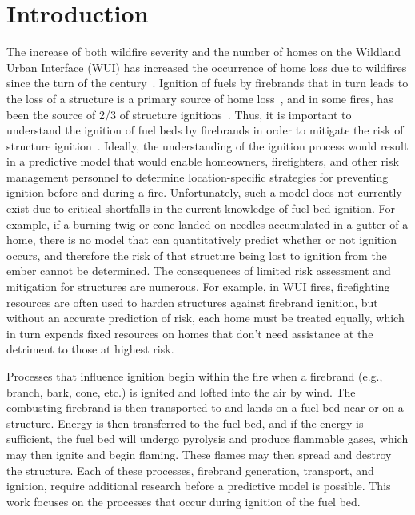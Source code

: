 \section{Introduction}
    The increase of both wildfire severity and the number of homes on the Wildland Urban Interface (WUI) has increased the occurrence of home loss due to wildfires since the turn of the century~\cite{Manzello2013}. Ignition of fuels by firebrands that in turn leads to the loss of a structure is a primary source of home loss~\cite{Koo2010a, Syphard2019, Roberts2021}, and in some fires, has been the source of 2/3 of structure ignitions~\cite{Maranghides2013NISTIgnitions}. Thus, it is important to understand the ignition of fuel beds by firebrands in order to mitigate the risk of structure ignition~\cite{Manzello2014}. Ideally, the understanding of the ignition process would result in a predictive model that would enable homeowners, firefighters, and other risk management personnel to determine location-specific strategies for preventing ignition before and during a fire. Unfortunately, such a model does not currently exist due to critical shortfalls in the current knowledge of fuel bed ignition. For example, if a burning twig or cone landed on needles accumulated in a gutter of a home, there is no model that can quantitatively predict whether or not ignition occurs, and therefore the risk of that structure being lost to ignition from the ember cannot be determined. The consequences of limited risk assessment and mitigation for structures are numerous. For example, in WUI fires, firefighting resources are often used to harden structures against firebrand ignition, but without an accurate prediction of risk, each home must be treated equally, which in turn expends fixed resources on homes that don't need assistance at the detriment to those at highest risk. 
    
    Processes that influence ignition begin within the fire when a firebrand (e.g., branch, bark, cone, etc.) is ignited and lofted into the air by wind. The combusting firebrand is then transported to and lands on a fuel bed near or on a structure. Energy is then transferred to the fuel bed, and if the energy is sufficient, the fuel bed will undergo pyrolysis and produce flammable gases, which may then ignite and begin flaming. These flames may then spread and destroy the structure. Each of these processes, firebrand generation, transport, and ignition, require additional research before a predictive model is possible. This work focuses on the processes that occur during ignition of the fuel bed.
    
